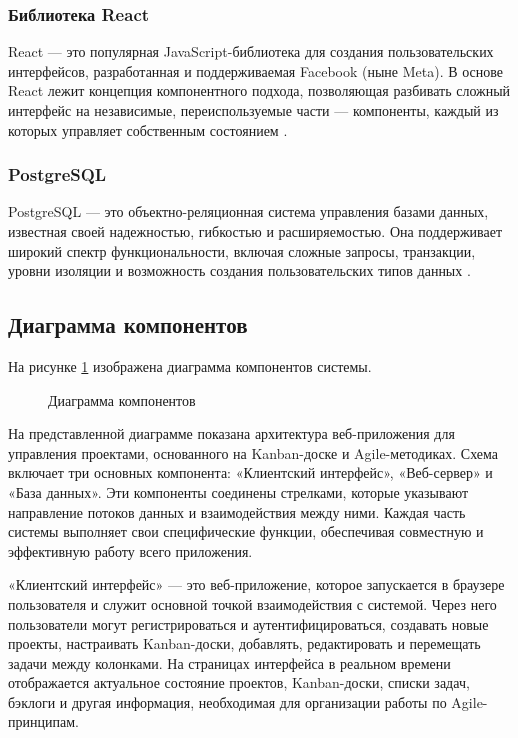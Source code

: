 \subsubsection{Библиотека React}
React — это популярная JavaScript-библиотека для создания пользовательских интерфейсов, разработанная и поддерживаемая Facebook (ныне Meta). В основе React лежит концепция компонентного подхода, позволяющая разбивать сложный интерфейс на независимые, переиспользуемые части — компоненты, каждый из которых управляет собственным состоянием \cite{react1}.

\subsubsection{PostgreSQL}

PostgreSQL — это объектно-реляционная система управления базами данных, известная своей надежностью, гибкостью и расширяемостью. Она поддерживает широкий спектр функциональности, включая сложные запросы, транзакции, уровни изоляции и возможность создания пользовательских типов данных \cite{postgres1}.

\subsection{Диаграмма компонентов}

 На рисунке \ref{components_diagram.eps:image} изображена диаграмма компонентов системы.
 
 \begin{figure}[ht]
 	\caption{Диаграмма компонентов}
 	\label{components_diagram.eps:image}
 \end{figure}
 
 На представленной диаграмме показана архитектура веб-приложения для управления проектами, основанного на Kanban-доске и Agile-методиках. Схема включает три основных компонента: «Клиентский интерфейс», «Веб-сервер» и «База данных». Эти компоненты соединены стрелками, которые указывают направление потоков данных и взаимодействия между ними. Каждая часть системы выполняет свои специфические функции, обеспечивая совместную и эффективную работу всего приложения.
 
 «Клиентский интерфейс» — это веб-приложение, которое запускается в браузере пользователя и служит основной точкой взаимодействия с системой. Через него пользователи могут регистрироваться и аутентифицироваться, создавать новые проекты, настраивать Kanban-доски, добавлять, редактировать и перемещать задачи между колонками. На страницах интерфейса в реальном времени отображается актуальное состояние проектов, Kanban-доски, списки задач, бэклоги и другая информация, необходимая для организации работы по Agile-принципам.
 
